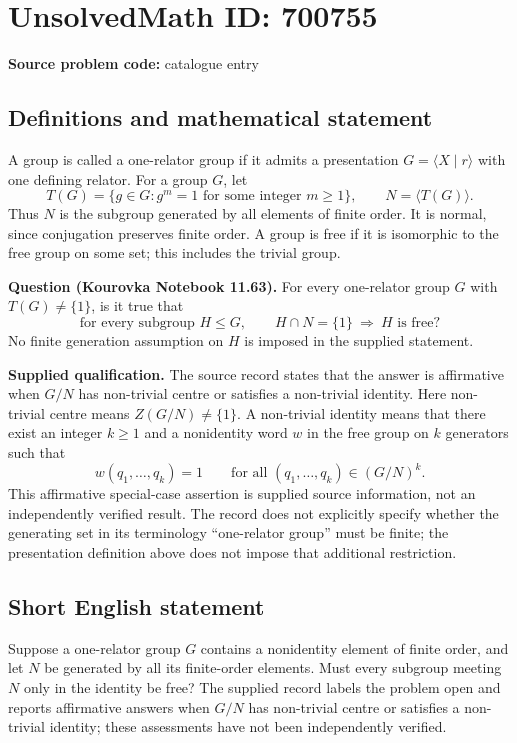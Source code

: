 \documentclass[11pt]{article}
\begin{document}
\section*{UnsolvedMath ID: 700755}
\textbf{Source problem code:} catalogue entry
\subsection{Definitions and mathematical statement}
A group is called a one-relator group if it admits a presentation \(G=\langle X\mid r\rangle\) with one defining relator. For a group \(G\), let
\[
T(G)=\{g\in G: g^m=1\text{ for some integer }m\geq 1\},
\qquad N=\langle T(G)\rangle.
\]
Thus \(N\) is the subgroup generated by all elements of finite order. It is normal, since conjugation preserves finite order. A group is free if it is isomorphic to the free group on some set; this includes the trivial group.

\textbf{Question (Kourovka Notebook 11.63).} For every one-relator group \(G\) with \(T(G)\neq\{1\}\), is it true that
\[
\text{for every subgroup }H\leq G,\qquad H\cap N=\{1\}\ \Longrightarrow\ H\text{ is free}?
\]
No finite generation assumption on \(H\) is imposed in the supplied statement.

\textbf{Supplied qualification.} The source record states that the answer is affirmative when \(G/N\) has non-trivial centre or satisfies a non-trivial identity. Here non-trivial centre means \(Z(G/N)\neq\{1\}\). A non-trivial identity means that there exist an integer \(k\geq1\) and a nonidentity word \(w\) in the free group on \(k\) generators such that
\[
w(q_1,\ldots,q_k)=1\qquad\text{for all }(q_1,\ldots,q_k)\in(G/N)^k.
\]
This affirmative special-case assertion is supplied source information, not an independently verified result. The record does not explicitly specify whether the generating set in its terminology ``one-relator group'' must be finite; the presentation definition above does not impose that additional restriction.
\subsection{Short English statement}
Suppose a one-relator group \(G\) contains a nonidentity element of finite order, and let \(N\) be generated by all its finite-order elements. Must every subgroup meeting \(N\) only in the identity be free? The supplied record labels the problem open and reports affirmative answers when \(G/N\) has non-trivial centre or satisfies a non-trivial identity; these assessments have not been independently verified.
\end{document}
